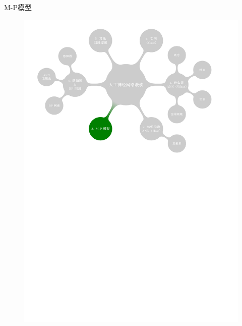 \documentclass[xcolor=svgnames]{beamer}
\begin{document}
\begin{frame}{M-P模型}
  \vspace{-1em}
  \begin{figure}
    \centering
    \includegraphics[width=\textwidth]{mindmap/map4.pdf}
  \end{figure}
\end{frame}
\end{document}
